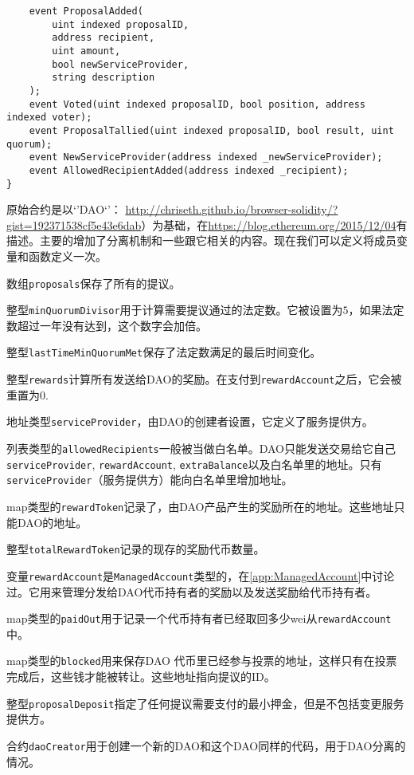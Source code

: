 \documentclass[9pt,oneside]{amsart}
\begin{document}
\begin{verbatim}
    event ProposalAdded(
        uint indexed proposalID,
        address recipient,
        uint amount,
        bool newServiceProvider,
        string description
    );
    event Voted(uint indexed proposalID, bool position, address indexed voter);
    event ProposalTallied(uint indexed proposalID, bool result, uint quorum);
    event NewServiceProvider(address indexed _newServiceProvider);
    event AllowedRecipientAdded(address indexed _recipient);
}

\end{verbatim}
\begin{multicols}{2}
原始合约是以‘’DAO‘’： \url{http://chriseth.github.io/browser-solidity/?gist=192371538cf5e43e6dab}）为基础，在\url{https://blog.ethereum.org/2015/12/04}有描述。主要的增加了分离机制和一些跟它相关的内容。现在我们可以定义将成员变量和函数定义一次。

数组\verb|proposals|保存了所有的提议。

整型\verb|minQuorumDivisor|用于计算需要提议通过的法定数。它被设置为$5$，如果法定数超过一年没有达到，这个数字会加倍。

整型\verb|lastTimeMinQuorumMet|保存了法定数满足的最后时间变化。

整型\verb|rewards|计算所有发送给DAO的奖励。在支付到\verb|rewardAccount|之后，它会被重置为0.

地址类型\verb|serviceProvider|，由DAO的创建者设置，它定义了服务提供方。

列表类型的\verb|allowedRecipients|一般被当做白名单。DAO只能发送交易给它自己\verb|serviceProvider|, \verb|rewardAccount|, \verb|extraBalance|以及白名单里的地址。只有\verb|serviceProvider|（服务提供方）能向白名单里增加地址。

map类型的\verb|rewardToken|记录了，由DAO产品产生的奖励所在的地址。这些地址只能DAO的地址。

整型\verb|totalRewardToken|记录的现存的奖励代币数量。

变量\verb|rewardAccount|是\verb|ManagedAccount|类型的，在\ref{app:ManagedAccount}中讨论过。它用来管理分发给DAO代币持有者的奖励以及发送奖励给代币持有者。

map类型的\verb|paidOut|用于记录一个代币持有者已经取回多少wei从\verb|rewardAccount|中。

map类型的\verb|blocked|用来保存DAO 代币里已经参与投票的地址，这样只有在投票完成后，这些钱才能被转让。这些地址指向提议的ID。

整型\verb|proposalDeposit|指定了任何提议需要支付的最小押金，但是不包括变更服务提供方。

合约\verb|daoCreator|用于创建一个新的DAO和这个DAO同样的代码，用于DAO分离的情况。


\end{multicols}
\end{document}
